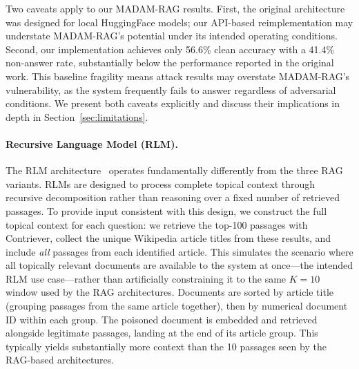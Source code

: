 \documentclass[11pt]{article}
\begin{document}
Two caveats apply to our MADAM-RAG results. First, the original architecture was designed for local HuggingFace models; our API-based reimplementation may understate MADAM-RAG's potential under its intended operating conditions. Second, our implementation achieves only 56.6\% clean accuracy with a 41.4\% non-answer rate, substantially below the performance reported in the original work. This baseline fragility means attack results may overstate MADAM-RAG's vulnerability, as the system frequently fails to answer regardless of adversarial conditions. We present both caveats explicitly and discuss their implications in depth in Section~\ref{sec:limitations}.

\paragraph{Recursive Language Model (RLM).} The RLM architecture~\citep{zhang2025rlm} operates fundamentally differently from the three RAG variants. RLMs are designed to process complete topical context through recursive decomposition rather than reasoning over a fixed number of retrieved passages. To provide input consistent with this design, we construct the full topical context for each question: we retrieve the top-100 passages with Contriever, collect the unique Wikipedia article titles from these results, and include \emph{all} passages from each identified article. This simulates the scenario where all topically relevant documents are available to the system at once---the intended RLM use case---rather than artificially constraining it to the same $K{=}10$ window used by the RAG architectures. Documents are sorted by article title (grouping passages from the same article together), then by numerical document ID within each group. The poisoned document is embedded and retrieved alongside legitimate passages, landing at the end of its article group. This typically yields substantially more context than the 10 passages seen by the RAG-based architectures.
\end{document}
